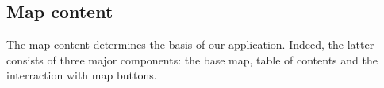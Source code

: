 
\subsection{Map content}


The map content determines the basis of our application. Indeed, the latter consists of three major components: the base map, table of contents and the interraction with map buttons.




